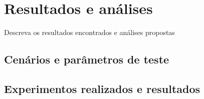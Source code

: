 \chapter{Resultados e análises}\label{cap:resultados}

Descreva os resultados encontrados e análises propostas

\section{Cenários e parâmetros de teste}\label{sec:cenarios}


\section{Experimentos realizados e resultados}\label{sec:resultados}

